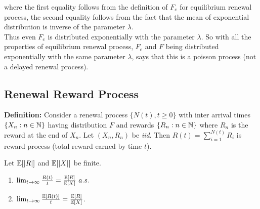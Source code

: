 \documentclass[a4paper,10pt,english]{article}
\begin{document}
where the first equality follows from the definition of $ F_e $ for equilibrium renewal process, the second equality follows from the fact that the mean of exponential distribution is inverse of the parameter $ \lambda $.\\
Thus even $ F_e $ is distributed exponentially with the parameter $ \lambda $. So with all the properties of equilibrium renewal process, $ F_e $ and $ F $ being distributed exponentially with the same parameter $ \lambda $, says that this is a poisson process (not a delayed renewal process).

\subsection{Renewal Reward Process}
\textbf{Definition:} Consider a renewal process $\{N(t), t \geq 0\}$ with inter arrival times $\{X_n: n \in \mathbb{N}\}$ having distribution $F$ and rewards $\{R_n: n \in \mathbb{N}\}$ where $R_n$ is the reward at the end of $X_n$. Let $(X_n,R_n)$ be \emph{iid}. Then $R(t)=\sum_{i=1}^{N(t)}R_i$ is reward process (total reward earned by time $t$). 
\begin{thm}
	\label{theorem}
Let $\mathbb{E}[|R|]$ and $\mathbb{E}[|X|]$ be finite.
\begin{enumerate}
\item $\lim_{t \rightarrow \infty} \frac{R(t)}{t} = \frac{\mathbb{E}[R]}{\mathbb{E}[X]} ~a.s.$
\item  $\lim_{t \rightarrow \infty} \frac{\mathbb{E}[R(t)]}{t} = \frac{\mathbb{E}[R]}{\mathbb{E}[X]}$.
\end{enumerate}
\end{thm}
\end{document}
